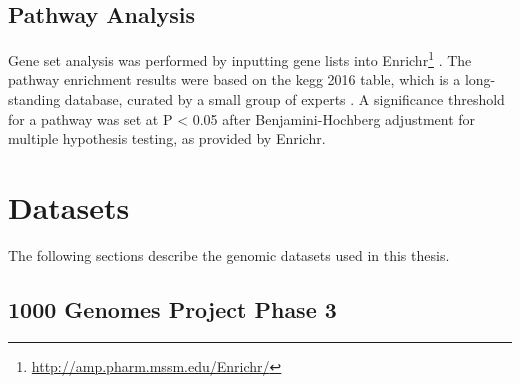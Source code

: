 \documentclass[]{report}
\newenvironment{Shaded}{\begin{snugshade}}{\end{snugshade}}
\newcommand{\KeywordTok}[1]{\textcolor[rgb]{0.13,0.29,0.53}{\textbf{#1}}}
\newcommand{\CommentTok}[1]{\textcolor[rgb]{0.56,0.35,0.01}{\textit{#1}}}
\newcommand{\FunctionTok}[1]{\textcolor[rgb]{0.00,0.00,0.00}{#1}}
\newcommand{\VariableTok}[1]{\textcolor[rgb]{0.00,0.00,0.00}{#1}}
\newcommand{\ExtensionTok}[1]{#1}
\newcommand{\NormalTok}[1]{#1}
\begin{document}
\begin{Shaded}
\end{Shaded}

\subsection{Pathway Analysis}\label{pathway-analysis-1}

Gene set analysis was performed by inputting gene lists into
Enrichr\footnote{\url{http://amp.pharm.mssm.edu/Enrichr/}}
\citep{Chen2013b, Kuleshov2016}. The pathway enrichment results were
based on the \gls{kegg} 2016 table, which is a long-standing database,
curated by a small group of experts \citep{Kanehisa2017}. A significance
threshold for a pathway was set at P \textless{} 0.05 after
Benjamini-Hochberg adjustment \citep{Benjamini1995} for multiple
hypothesis testing, as provided by Enrichr.

\section{Datasets}\label{datasets}

The following sections describe the genomic datasets used in this
thesis.

\subsection{1000 Genomes Project Phase 3}\label{kgpdesc}
\end{document}
